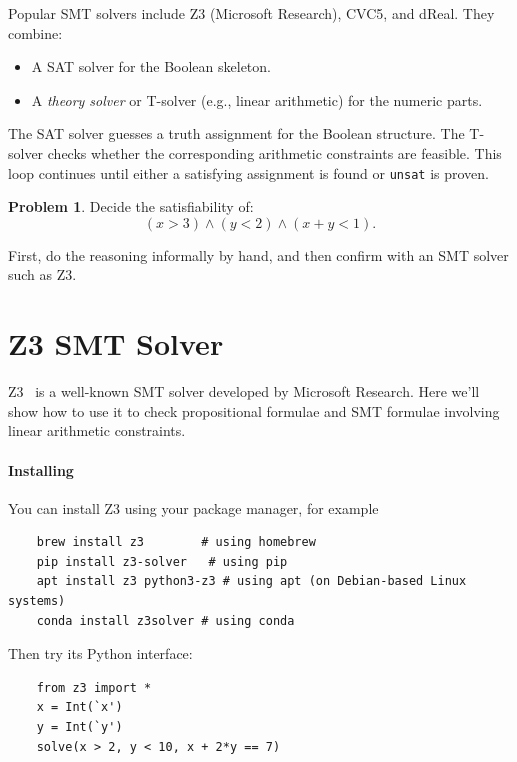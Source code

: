 \documentclass[oneside,11pt,dvipsnames]{book}
\numberwithin{equation}{section}
\theoremstyle{definition}
\newtheorem{problem}{Problem}[section]
\theoremstyle{remark}
\newcommand{\unsat}{\texttt{unsat}}
\begin{document}

Popular SMT solvers include Z3 (Microsoft Research), CVC5, and dReal.
They combine:
\begin{itemize}
  \item A SAT solver for the Boolean skeleton.
  \item A \emph{theory solver} or T-solver (e.g., linear arithmetic) for the numeric parts.
\end{itemize}

The SAT solver guesses a truth assignment for the Boolean structure. The T-solver checks whether the corresponding arithmetic constraints are feasible. This loop continues until either a satisfying assignment is found or \unsat{} is proven.

\begin{problem}
Decide the satisfiability of:
\[
(x > 3) \land (y < 2) \land (x+y < 1).
\]

First, do the reasoning informally by hand, and then confirm with an SMT solver such as Z3.
\end{problem}


\section{Z3 SMT Solver}\label{sec:z3}

Z3~\cite{de2008z3} is a well-known SMT solver developed by Microsoft Research. Here we'll show how to use it to check propositional formulae and SMT formulae involving linear arithmetic constraints.

\paragraph{Installing} You can install Z3 using your package manager, for example

\begin{lstlisting}
    brew install z3        # using homebrew
    pip install z3-solver   # using pip
    apt install z3 python3-z3 # using apt (on Debian-based Linux systems)
    conda install z3solver # using conda
\end{lstlisting}


Then try its Python interface:

\begin{lstlisting}
    from z3 import *
    x = Int(`x')
    y = Int(`y')
    solve(x > 2, y < 10, x + 2*y == 7)
\end{lstlisting}
\end{document}
